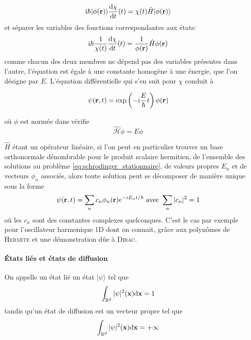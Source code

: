 \documentclass[svgnames,dvipsnames,a4paper,10pt,french]{report}
\begin{document}
 \begin{equation}
    \mathrm{i} \hbar |\phi(\mathbf{r})\rangle \frac{\mathrm{d}\chi}{\mathrm{d}t}(t) = \chi(t)\hat{H} |\phi(\mathbf{r})\rangle
 \end{equation}
 et séparer les variables des fonctions correspondantes aux états:
 \begin{equation}
     \mathrm{i} \hbar \frac{1}{\chi(t)} \frac{\mathrm{d}\chi}{\mathrm{d}t}(t) = \frac{1}{\phi(\mathbf{r})}\hat{H} \phi(\mathbf{r})
 \end{equation}
 comme chacun des deux membres ne dépend pas des variables présentes dans l'autre, l'équation est égale à une constante homogène à une énergie, que l'on désigne par $E$. L'équation différentielle qui s'en suit pour $\chi$ conduit à 
 
 \begin{equation}
     \psi(\mathbf{r},t) = \exp \left( -\mathrm{i}\frac{E}{\hbar} t \right) \phi(\mathbf{r})
 \end{equation}

 où $\phi$ est normée dans vérifie 
\begin{equation}
\label{eq:schrodinger_stationnaire}
    \hat{\mathcal{H}} \phi = E \phi
\end{equation}

$\hat{H}$ étant un opérateur linéaire, si l'on peut en particulier trouver un base orthonormale dénombrable pour le produit scalaire hermitien, de l'ensemble des solutions au problème \ref{eq:schrodinger_stationnaire}, de valeurs propres $E_n$ et de vecteurs $\phi_n$ associés, alors toute solution peut se décomposer de manière unique sous la forme
\begin{equation}
    \psi (\mathbf{r},t) = \sum_n c_n \phi_n(\mathbf{r}) e^{-iE_n t/\hbar} \text{ avec } \sum_n |c_n|^2 = 1
\end{equation}
où les $c_n$ sont des constantes complexes quelconques. C'est le cas par exemple pour l'oscillateur harmonique 1D dont on connait, grâce aux polynômes de \textsc{Hermite} et une démonstration dûe à \textsc{Dirac}. 


\paragraph{États liés et états de diffusion}
On appelle un état lié un état $|\psi \rangle$ tel que 
\begin{equation}
    \int_{\mathbb{R}^d} |\psi|^2(\mathbf{x}) \mathrm{d} \mathbf{x} = 1
\end{equation}
tandis qu'un état de diffusion est un vecteur propre tel que
\begin{equation}
    \int_{\mathbb{R}^d} |\psi|^2(\mathbf{x}) \mathrm{d} \mathbf{x} = +\infty
\end{equation}
\end{document}
